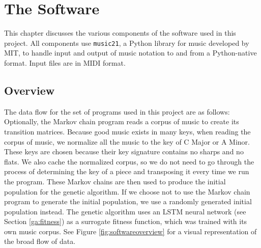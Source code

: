 \chapter{The Software} \label{software}

This chapter discusses the various components of the software used in this project.
All components use \texttt{music21}, a Python library for music developed by MIT, to handle input and output of music notation to and from a Python-native format.
Input files are in MIDI format.

\section{Overview} \label{software:overview}

The data flow for the set of programs used in this project are as follows:
Optionally, the Markov chain program reads a corpus of music to create its transition matrices.
Because good music exists in many keys, when reading the corpus of music, we normalize all the music to the key of C Major or A Minor.
These keys are chosen because their key signature contains no sharps and no flats.
We also cache the normalized corpus, so we do not need to go through the process of determining the key of a piece and transposing it every time we run the program.
These Markov chains are then used to produce the initial population for the genetic algorithm.
If we choose not to use the Markov chain program to generate the initial population, we use a randomly generated initial population instead.
The genetic algorithm uses an LSTM neural network (see Section \ref{ga:fitness}) as a surrogate fitness function, which was trained with its own music corpus.
See Figure \ref{fig:softwareoverview} for a visual representation of the broad flow of data.

